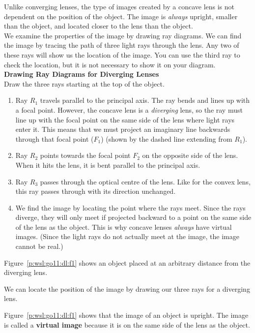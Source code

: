 Unlike converging lenses, the type of images created by a concave lens is not dependent on the position of the object. The image is \textit{always} upright, smaller than the object, and located closer to the lens than the object.\\

We examine the properties of the image by drawing ray diagrams. We can find the image by tracing the path of three light rays through the lens. Any two of these rays will show us the location of the image. You can use the third ray to check the location, but it is not necessary to show it on your diagram.\\

\textbf{Drawing Ray Diagrams for Diverging Lenses}\\
Draw the three rays starting at the top of the object.
\begin{enumerate}
\item Ray $R_{1}$ travels parallel to the principal axis. The ray bends and lines up with a focal point. However, the concave lens is a \textit{diverging} lens, so the ray must line up with the focal point on the same side of the lens where light rays enter it. This means that we must project an imaginary line backwards through that focal point ($F_{1}$) (shown by the dashed line extending from $R_{1}$).
\item Ray $R_{2}$ points towards the focal point $F_{2}$ on the opposite side of the lens. When it hits the lens, it is bent parallel to the principal axis.
\item Ray $R_{3}$ passes through the optical centre of the lens. Like for the convex lens, this ray passes through with its direction unchanged.
\item We find the image by locating the point where the rays meet. Since the rays diverge, they will only meet if projected backward to a point on the same side of the lens as the object. This is why concave lenses \textit{always} have virtual images. (Since the light rays do not actually meet at the image, the image cannot be real.)
\end{enumerate}

Figure~\ref{p:wsl:go11:dl:f1} shows an object placed at an arbitrary distance from the diverging lens.

We can locate the position of the image by drawing our three rays for a diverging lens.

Figure~\ref{p:wsl:go11:dl:f1} shows that the image of an object is upright. The image is called a \textbf{virtual image} because it is on the same side of the lens as the object.

